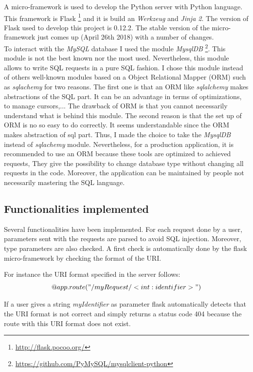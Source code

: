 A micro-framework is used to develop the Python server with Python language. This framework is Flask \footnote{\url{http://flask.pocoo.org/}} and it is build an \textit{Werkzeug} and \textit{Jinja 2}. The version of Flask used to develop this project is 0.12.2. The stable version of the micro-framework just comes up (April 26th 2018) with a number of changes. \\

To interact with the \textit{MySQL} database I used the module \textit{MysqlDB} \footnote{\url{https://github.com/PyMySQL/mysqlclient-python}}. This module is not the best known nor the most used. Nevertheless, this module allows to write SQL requests in a pure SQL fashion. I chose this module instead of others well-known modules based on a Object Relational Mapper (ORM) such as \textit{sqlachemy} for two reasons. The first one is that an ORM like \textit{sqlalchemy} makes abstractions of the SQL part. It can be an advantage in terms of optimizations, to manage cursors,... The drawback of ORM is that you cannot necessarily understand what is behind this module. The second reason is that the set up of ORM is no so easy to do correctly. It seems understandable since the ORM makes abstraction of sql part. Thus, I made the choice to take the \textit{MysqlDB} instead of \textit{sqlachemy} module. Nevertheless, for a production application, it is recommended to use an ORM because these tools are optimized to achieved requests, They give the possibility to change database type without changing all requests in the code. Moreover, the application can be maintained by people not necessarily mastering the SQL language.
\subsection{Functionalities implemented}
Several functionalities have been implemented. For each request done by a user, parameters sent with the requests are parsed to avoid SQL injection. Moreover, type parameters are also checked. A first check is automatically  done by the flask micro-framework by checking the format of the URI.

For instance the URI format specified in the server follows:
$$ @app.route("/myRequest/<int:identifier>")$$

If a user gives a string \textit{myIdentifier} as parameter flask automatically detects that the URI format is not correct and simply returns a status code 404 because the route with this URI format does not exist.\\

